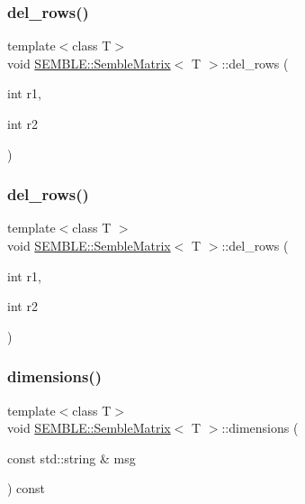 \subsubsection{\texorpdfstring{del\_rows()}{del\_rows()}\hspace{0.1cm}{\footnotesize\ttfamily [1/2]}}
{\footnotesize\ttfamily template$<$class T$>$ \\
void \mbox{\hyperlink{structSEMBLE_1_1SembleMatrix}{S\+E\+M\+B\+L\+E\+::\+Semble\+Matrix}}$<$ T $>$\+::del\+\_\+rows (\begin{DoxyParamCaption}\item[{int}]{r1,  }\item[{int}]{r2 }\end{DoxyParamCaption})}

\mbox{\label{structSEMBLE_1_1SembleMatrix_a648b1088d29de6b44ca6508492939b42}} 
\subsubsection{\texorpdfstring{del\_rows()}{del\_rows()}\hspace{0.1cm}{\footnotesize\ttfamily [2/2]}}
{\footnotesize\ttfamily template$<$class T $>$ \\
void \mbox{\hyperlink{structSEMBLE_1_1SembleMatrix}{S\+E\+M\+B\+L\+E\+::\+Semble\+Matrix}}$<$ T $>$\+::del\+\_\+rows (\begin{DoxyParamCaption}\item[{int}]{r1,  }\item[{int}]{r2 }\end{DoxyParamCaption})}

\mbox{\label{structSEMBLE_1_1SembleMatrix_ab778c582ca37ce69f2f9ab1074af0ca6}} 
\subsubsection{\texorpdfstring{dimensions()}{dimensions()}\hspace{0.1cm}{\footnotesize\ttfamily [1/2]}}
{\footnotesize\ttfamily template$<$class T$>$ \\
void \mbox{\hyperlink{structSEMBLE_1_1SembleMatrix}{S\+E\+M\+B\+L\+E\+::\+Semble\+Matrix}}$<$ T $>$\+::dimensions (\begin{DoxyParamCaption}\item[{const std\+::string \&}]{msg }\end{DoxyParamCaption}) const\hspace{0.3cm}{\ttfamily [inline]}}

